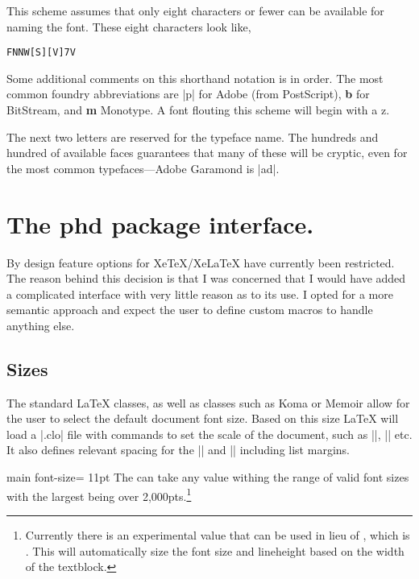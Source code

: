 This scheme assumes that only eight characters or fewer can be available for naming the font. These eight characters look like,

\begin{verbatim}
FNNW[S][V]7V
\end{verbatim}

Some additional comments on this shorthand notation is in order. 
The most common foundry abbreviations are |p| for Adobe (from PostScript), \textbf{b} for BitStream, and \textbf{m} Monotype. A font flouting this scheme will begin with a z.

The next two letters are reserved for the typeface name. The hundreds and hundred of available faces guarantees  that many of these will be cryptic, even for the most common typefaces---Adobe Garamond is |ad|. 





\section{The phd package interface.}

By design feature options for XeTeX/XeLaTeX have currently been restricted. The reason behind this decision is that I was concerned that I would have added a complicated interface with very little reason as to its use. I opted for a more semantic approach and expect the user to define custom macros to handle anything else.
\medskip

\subsection{Sizes}

The standard LaTeX classes, as well as classes such as Koma or Memoir allow for the user to select
the default document font size. Based on this size LaTeX will load a |.clo| file with commands
to set the scale of the document, such as |\small|, |\large| etc. It also defines relevant spacing
for the |\small| and |\footnotesize| including list margins.

\begin{docKey}[phd]{main font-size}{= }{11pt}
The  can take any value withing the range of valid font sizes with the largest being over
2,000pts.\footnote{Currently there is an experimental value that can be used in lieu of , which is . This will automatically size the font size and lineheight based on the width of the textblock.}
\end{docKey}

